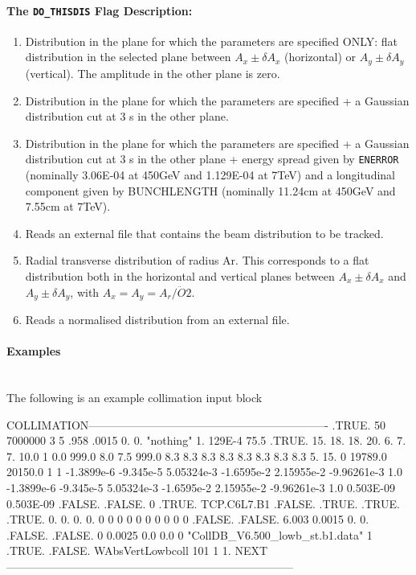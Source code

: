 \paragraph{The \texttt{DO\_THISDIS} Flag Description:}
\begin{enumerate}
\item Distribution in the plane for which the parameters are specified ONLY: flat distribution in the selected plane between $A_x \pm \delta A_x$ (horizontal) or $A_y \pm \delta A_y$ (vertical). The amplitude in the other plane is zero.
\item Distribution in the plane for which the parameters are specified + a Gaussian distribution cut at 3 s in the other plane.
\item Distribution in the plane for which the parameters are specified + a Gaussian distribution cut at 3 s in the other plane + energy spread given by \texttt{ENERROR} (nominally 3.06E-04 at 450GeV and 1.129E-04 at 7TeV) and a longitudinal component given by BUNCHLENGTH (nominally 11.24cm at 450GeV and 7.55cm at 7TeV).
\item Reads an external file that contains the beam distribution to be tracked.
\item Radial transverse distribution of radius Ar. This corresponds to a flat distribution both in the horizontal and vertical planes between $A_x \pm \delta A_x$ and $A_y \pm \delta A_y$, with $A_x = A_y = A_r/\ddot{O}2$.
\item Reads a normalised distribution from an external file.
\end{enumerate}

\paragraph{Examples}~\\

The following is an example collimation input block

\begin{cverbatim}
COLLIMATION----------------------------------------------------------------
    .TRUE.
    50   7000000
    3  5 .958  .0015  0.  0.  "nothing"  1. 129E-4  75.5
    .TRUE.  15.  18.  18.  20.  6.  7.  7.  10.0 1 0.0  999.0  8.0   7.5   999.0
    8.3  8.3  8.3  8.3  8.3  8.3  8.3  8.3  5. 15.
    0 19789.0  20150.0  1  1
   -1.3899e-6  -9.345e-5  5.05324e-3  -1.6595e-2  2.15955e-2  -9.96261e-3  1.0
   -1.3899e-6  -9.345e-5  5.05324e-3  -1.6595e-2  2.15955e-2  -9.96261e-3  1.0
    0.503E-09  0.503E-09
   .FALSE. .FALSE. 0 .TRUE. TCP.C6L7.B1 .FALSE. .TRUE. .TRUE. .TRUE.
   0.  0.  0.  0.
   0   0   0   0   0   0   0   0   0   0   .FALSE.
   .FALSE.  6.003  0.0015
   0.  0.  .FALSE. .FALSE.
   0   0.0025  0.0   0.0   0
   "CollDB_V6.500_lowb_st.b1.data"  1
   .TRUE. .FALSE. WAbsVertLowbcoll  101  1  1.
NEXT-----------------------------------------------------------------------------
\end{cverbatim}
